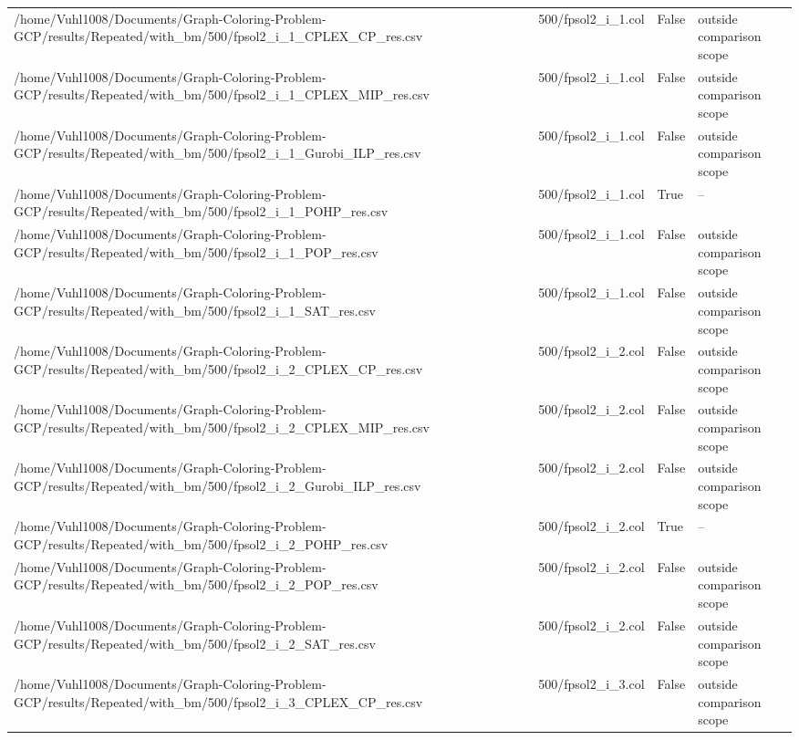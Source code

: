 \begin{table}[htbp]
\begin{tabular}{llll}
/home/Vuhl1008/Documents/Graph-Coloring-Problem-GCP/results/Repeated/with\_bm/500/fpsol2\_i\_1\_CPLEX\_CP\_res.csv & 500/fpsol2\_i\_1.col & False & outside comparison scope \\
/home/Vuhl1008/Documents/Graph-Coloring-Problem-GCP/results/Repeated/with\_bm/500/fpsol2\_i\_1\_CPLEX\_MIP\_res.csv & 500/fpsol2\_i\_1.col & False & outside comparison scope \\
/home/Vuhl1008/Documents/Graph-Coloring-Problem-GCP/results/Repeated/with\_bm/500/fpsol2\_i\_1\_Gurobi\_ILP\_res.csv & 500/fpsol2\_i\_1.col & False & outside comparison scope \\
/home/Vuhl1008/Documents/Graph-Coloring-Problem-GCP/results/Repeated/with\_bm/500/fpsol2\_i\_1\_POHP\_res.csv & 500/fpsol2\_i\_1.col & True & -- \\
/home/Vuhl1008/Documents/Graph-Coloring-Problem-GCP/results/Repeated/with\_bm/500/fpsol2\_i\_1\_POP\_res.csv & 500/fpsol2\_i\_1.col & False & outside comparison scope \\
/home/Vuhl1008/Documents/Graph-Coloring-Problem-GCP/results/Repeated/with\_bm/500/fpsol2\_i\_1\_SAT\_res.csv & 500/fpsol2\_i\_1.col & False & outside comparison scope \\
/home/Vuhl1008/Documents/Graph-Coloring-Problem-GCP/results/Repeated/with\_bm/500/fpsol2\_i\_2\_CPLEX\_CP\_res.csv & 500/fpsol2\_i\_2.col & False & outside comparison scope \\
/home/Vuhl1008/Documents/Graph-Coloring-Problem-GCP/results/Repeated/with\_bm/500/fpsol2\_i\_2\_CPLEX\_MIP\_res.csv & 500/fpsol2\_i\_2.col & False & outside comparison scope \\
/home/Vuhl1008/Documents/Graph-Coloring-Problem-GCP/results/Repeated/with\_bm/500/fpsol2\_i\_2\_Gurobi\_ILP\_res.csv & 500/fpsol2\_i\_2.col & False & outside comparison scope \\
/home/Vuhl1008/Documents/Graph-Coloring-Problem-GCP/results/Repeated/with\_bm/500/fpsol2\_i\_2\_POHP\_res.csv & 500/fpsol2\_i\_2.col & True & -- \\
/home/Vuhl1008/Documents/Graph-Coloring-Problem-GCP/results/Repeated/with\_bm/500/fpsol2\_i\_2\_POP\_res.csv & 500/fpsol2\_i\_2.col & False & outside comparison scope \\
/home/Vuhl1008/Documents/Graph-Coloring-Problem-GCP/results/Repeated/with\_bm/500/fpsol2\_i\_2\_SAT\_res.csv & 500/fpsol2\_i\_2.col & False & outside comparison scope \\
/home/Vuhl1008/Documents/Graph-Coloring-Problem-GCP/results/Repeated/with\_bm/500/fpsol2\_i\_3\_CPLEX\_CP\_res.csv & 500/fpsol2\_i\_3.col & False & outside comparison scope \\

\end{tabular}
\end{table}
